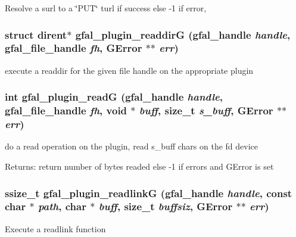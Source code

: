 Resolve a surl to a \char`\"{}PUT\char`\"{} turl  if success else -1 if error, 
\subsubsection{\setlength{\rightskip}{0pt plus 5cm}struct dirent$\ast$ gfal\_\-plugin\_\-readdir\-G (gfal\_\-handle {\em handle}, gfal\_\-file\_\-handle {\em fh}, GError $\ast$$\ast$ {\em err})}\label{gfal__common__plugin_8c_7fd9e55c89de0f0a85127972cecffcfd}


execute a readdir for the given file handle on the appropriate plugin 
\subsubsection{\setlength{\rightskip}{0pt plus 5cm}int gfal\_\-plugin\_\-read\-G (gfal\_\-handle {\em handle}, gfal\_\-file\_\-handle {\em fh}, void $\ast$ {\em buff}, size\_\-t {\em s\_\-buff}, GError $\ast$$\ast$ {\em err})}\label{gfal__common__plugin_8c_d536879bc7813a35bc79318ce43f0b57}


do a read operation on the plugin, read s\_\-buff chars on the fd device \begin{Desc}
\item[Returns:]return number of bytes readed else -1 if errors and GError is set \end{Desc}
\subsubsection{\setlength{\rightskip}{0pt plus 5cm}ssize\_\-t gfal\_\-plugin\_\-readlink\-G (gfal\_\-handle {\em handle}, const char $\ast$ {\em path}, char $\ast$ {\em buff}, size\_\-t {\em buffsiz}, GError $\ast$$\ast$ {\em err})}\label{gfal__common__plugin_8c_d2e6e573b52926185793ff4f0dd5e307}


Execute a readlink function 
